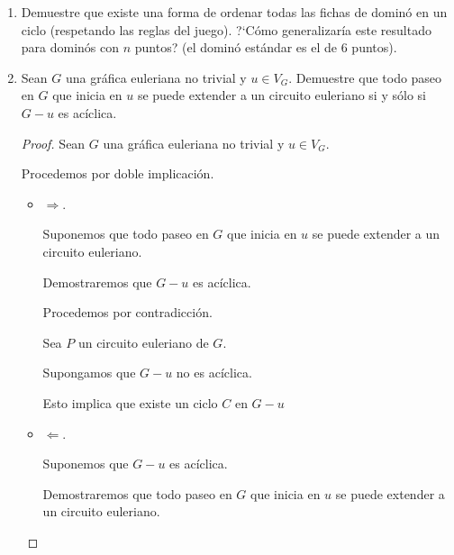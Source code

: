 \documentclass{article}
\begin{document}
\begin{enumerate}
      \item Demuestre que existe una forma de ordenar todas las fichas
        de domin\'o en un ciclo (respetando las reglas del juego).
        ?`C\'omo generalizar\'ia este resultado para domin\'os con
        $n$ puntos? (el domin\'o est\'andar es el de $6$ puntos).

      \item Sean $G$ una gr\'afica euleriana no trivial
        y $u \in V_G$. Demuestre que todo paseo en $G$
        que inicia en $u$ se puede extender a un circuito
        euleriano si y s\'olo si $G-u$ es ac\'iclica.

        \begin{proof}
          Sean $G$ una gr\'afica euleriana no trivial y $u \in V_{G}$.

          Procedemos por doble implicación.

          \begin{itemize}
            \item $\Longrightarrow$.

              Suponemos que todo paseo en $G$ que inicia en $u$ se puede extender a un circuito euleriano.

              Demostraremos que $G-u$ es ac\'iclica.

              Procedemos por contradicción.

              Sea $P$ un circuito euleriano de $G$.

              Supongamos que $G-u$ no es ac\'iclica.

              Esto implica que existe un ciclo $C$ en $G-u$

            \item $\Longleftarrow$.

              Suponemos que $G-u$ es ac\'iclica.

              Demostraremos que todo paseo en $G$ que inicia en $u$ se puede extender a un circuito euleriano.
          \end{itemize}
        \end{proof}
    \end{enumerate}
\end{document}
